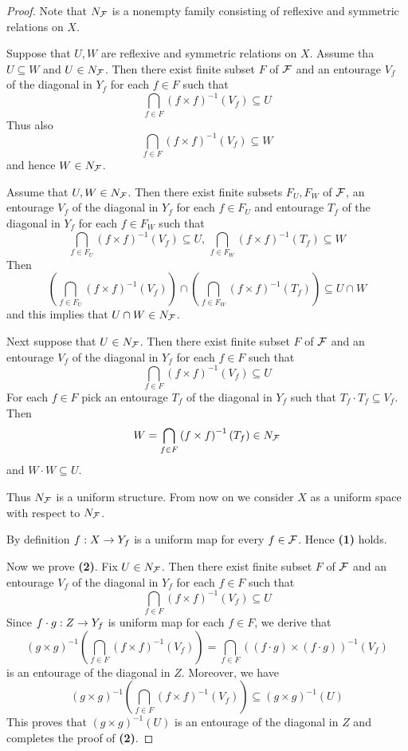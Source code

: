 \documentclass[10pt]{amsart}
\begin{document}
\begin{proof}
	Note that $N_{{\mathcal F}}$ is a nonempty family consisting of reflexive and symmetric relations on $X$.

	Suppose that $U,W$ are reflexive and symmetric relations on $X$. Assume tha $U\subseteq W$ and $U \in N_{{\mathcal F}}$. Then there exist finite subset $F$ of ${\mathcal F}$ and an entourage $V_f$ of the diagonal in $Y_f$ for each $f\in F$ such that
	$$\bigcap_{f\in F}\left(f\times f\right)^{-1}(V_f) \subseteq U$$
	Thus also
	$$\bigcap_{f\in F}\left(f\times f\right)^{-1}(V_f) \subseteq W$$
	and hence $W \in N_{{\mathcal F}}$.

	Assume that $U,W \in N_{{\mathcal F}}$. Then there exist finite subsets $F_U,F_W$ of ${\mathcal F}$, an entourage $V_f$ of the diagonal in $Y_f$ for each $f\in F_U$ and entourage $T_f$ of the diagonal in $Y_f$ for each $f\in F_W$ such that
	$$\bigcap_{f\in F_U}\left(f\times f\right)^{-1}(V_f) \subseteq U,\,\bigcap_{f\in F_W}\left(f\times f\right)^{-1}(T_f)\subseteq W$$
	Then
	$$\left(\bigcap_{f\in F_U}\left(f\times f\right)^{-1}(V_f) \right) \cap \left(\bigcap_{f \in F_W}\left(f\times f\right)^{-1}(T_f)\right)\subseteq U\cap W$$
	and this implies that $U\cap W \in N_{{\mathcal F}}$.

	Next suppose that $U \in N_{{\mathcal F}}$. Then there exist finite subset $F$ of ${\mathcal F}$ and an entourage $V_f$ of the diagonal in $Y_f$ for each $f\in F$ such that
	$$\bigcap_{f\in F}\left(f\times f\right)^{-1}(V_f) \subseteq U$$
	For each $f \in F$ pick an entourage $T_f$ of the diagonal in $Y_f$ such that $T_f\cdot T_f \subseteq V_f$. Then
	$$W = \bigcap_{f \in F}\left(f\times f\right)^{-1}(T_f) \in N_{{\mathcal F}}$$
	and $W\cdot W \subseteq U$.

	Thus $N_{{\mathcal F}}$ is a uniform structure. From now on we consider $X$ as a uniform space with respect to $N_{{\mathcal F}}$.

	By definition $f:X\rightarrow Y_f$ is a uniform map for every $f\in {\mathcal F}$. Hence \textbf{(1)} holds.

	Now we prove \textbf{(2)}. Fix $U \in N_{{\mathcal F}}$. Then there exist finite subset $F$ of ${\mathcal F}$ and an entourage $V_f$ of the diagonal in $Y_f$ for each $f\in F$ such that
	$$\bigcap_{f\in F}\left(f\times f\right)^{-1}(V_f) \subseteq U$$
	Since $f\cdot g:Z\rightarrow Y_f$ is uniform map for each $f \in F$, we derive that
	$$\left(g\times g\right)^{-1}\left(\bigcap_{f\in F}\left(f\times f\right)^{-1}\left(V_f\right)\right) = \bigcap_{f\in F}\left((f\cdot g)\times (f\cdot g)\right)^{-1}(V_f)$$
	is an entourage of the diagonal in $Z$. Moreover, we have
	$$\left(g\times g\right)^{-1}\left(\bigcap_{f\in F}\left(f\times f\right)^{-1}\left(V_f\right)\right) \subseteq \left(g\times g\right)^{-1}(U)$$
	This proves that $(g\times g)^{-1}(U)$ is an entourage of the diagonal in $Z$ and completes the proof of \textbf{(2)}.
\end{proof}
\end{document}
